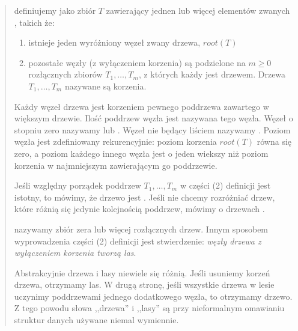 \begin{quote}

 definiujemy jako zbiór $T$ zawierający jednen lub więcej elementów zwanych , takich że:

\begin{enumerate}
 \item istnieje jeden wyróżniony węzeł zwany  drzewa, $root(T)$
 \item pozostałe węzły (z wyłączeniem korzenia) są podzielone na $m \geq 0$ rozłącznych zbiorów $T_{1},\ldots, T_{m}$,
	z których każdy jest drzewem. Drzewa $T_{1},\ldots, T_{m}$ nazywane są  korzenia.
\end{enumerate}

Każdy węzeł drzewa jest korzeniem pewnego poddrzewa zawartego w większym drzewie.
Ilość poddrzew węzła jest nazywana  tego węzła.
Węzeł o stopniu zero nazywamy  lub . 
Węzeł nie będący liściem nazywamy . 
Poziom węzła jest zdefiniowany rekurencyjnie: poziom korzenia $root(T)$ równa się zero,
a poziom każdego innego węzła jest o jeden wiekszy niż poziom korzenia w najmniejszym 
 zawierającym go poddrzewie.
%
%



Jeśli względny porządek poddrzew $T_{1},\ldots, T_{m}$ w części (2) definicji jest istotny,
to mówimy, że drzewo jest . 
Jeśli nie chcemy rozróżniać drzew, które różnią się jedynie kolejnością poddrzew, mówimy o drzewach .

 nazywamy zbiór zera lub więcej rozłącznych drzew. 
Innym sposobem wyprowadzenia części (2) definicji jest stwierdzenie: \textit{węzły drzewa z wyłączeniem korzenia tworzą las}.

Abstrakcyjnie drzewa i lasy niewiele się różnią.
Jeśli usuniemy korzeń drzewa, otrzymamy las.
W drugą stronę, jeśli wszystkie drzewa w lesie uczynimy poddrzewami jednego dodatkowego węzła, to otrzymamy drzewo.
Z tego powodu słowa ,,drzewa'' i ,,lasy'' są przy nieformalnym omawianiu struktur danych używane niemal wymiennie.

\end{quote}

